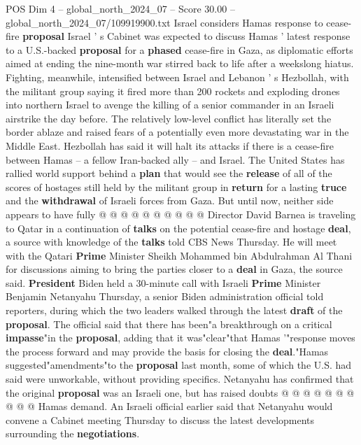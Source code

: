 \begin{textsample}{POS Dim 4 – global\_north\_2024\_07 – Score 30.00 – global\_north\_2024\_07/109919900.txt}  \label{ex:f4_pos_171}
Israel considers Hamas response to cease-fire \textbf{proposal} Israel ' s Cabinet was expected to discuss Hamas ' latest response to a U.S.-backed \textbf{proposal} for a \textbf{phased} cease-fire in Gaza, as diplomatic efforts aimed at ending the nine-month war stirred back to life after a weekslong hiatus.
Fighting, meanwhile, intensified between Israel and Lebanon ' s Hezbollah, with the militant group saying it fired more than 200 rockets and exploding drones into northern Israel to avenge the killing of a senior commander in an Israeli airstrike the day before.
The relatively low-level conflict has literally set the border ablaze and raised fears of a potentially even more devastating war in the Middle East.
Hezbollah has said it will halt its attacks if there is a cease-fire between Hamas -- a fellow Iran-backed ally -- and Israel.
The United States has rallied world support behind a \textbf{plan} that would see the \textbf{release} of all of the scores of hostages still held by the militant group in \textbf{return} for a lasting \textbf{truce} and the \textbf{withdrawal} of Israeli forces from Gaza.
But until now, neither side appears to have fully @ @ @ @ @ @ @ @ @ @ Director David Barnea is traveling to Qatar in a continuation of \textbf{talks} on the potential cease-fire and hostage \textbf{deal}, a source with knowledge of the \textbf{talks} told CBS News Thursday.
He will meet with the Qatari \textbf{Prime} Minister Sheikh Mohammed bin Abdulrahman Al Thani for discussions aiming to bring the parties closer to a \textbf{deal} in Gaza, the source said. \textbf{President} Biden held a 30-minute call with Israeli \textbf{Prime} Minister Benjamin Netanyahu Thursday, a senior Biden administration official told reporters, during which the two leaders walked through the latest \textbf{draft} of the \textbf{proposal}.
The official said that there has been"a breakthrough on a critical \textbf{impasse}"in the \textbf{proposal}, adding that it was"clear"that Hamas '"response moves the process forward and may provide the basis for closing the \textbf{deal}."Hamas suggested"amendments"to the \textbf{proposal} last month, some of which the U.S. had said were unworkable, without providing specifics.
Netanyahu has confirmed that the original \textbf{proposal} was an Israeli one, but has raised doubts @ @ @ @ @ @ @ @ @ @ Hamas demand.
An Israeli official earlier said that Netanyahu would convene a Cabinet meeting Thursday to discuss the latest developments surrounding the \textbf{negotiations}.

\end{textsample}

